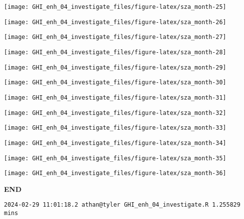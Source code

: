\documentclass[
  10pt,
  a4paper,oneside]{article}
\begin{document}
\begin{center}\texttt{[image: GHI\_enh\_04\_investigate\_files/figure-latex/sza\_month-25]} \end{center}

\begin{center}\texttt{[image: GHI\_enh\_04\_investigate\_files/figure-latex/sza\_month-26]} \end{center}

\begin{center}\texttt{[image: GHI\_enh\_04\_investigate\_files/figure-latex/sza\_month-27]} \end{center}

\begin{center}\texttt{[image: GHI\_enh\_04\_investigate\_files/figure-latex/sza\_month-28]} \end{center}

\begin{center}\texttt{[image: GHI\_enh\_04\_investigate\_files/figure-latex/sza\_month-29]} \end{center}

\begin{center}\texttt{[image: GHI\_enh\_04\_investigate\_files/figure-latex/sza\_month-30]} \end{center}

\begin{center}\texttt{[image: GHI\_enh\_04\_investigate\_files/figure-latex/sza\_month-31]} \end{center}

\begin{center}\texttt{[image: GHI\_enh\_04\_investigate\_files/figure-latex/sza\_month-32]} \end{center}

\begin{center}\texttt{[image: GHI\_enh\_04\_investigate\_files/figure-latex/sza\_month-33]} \end{center}

\begin{center}\texttt{[image: GHI\_enh\_04\_investigate\_files/figure-latex/sza\_month-34]} \end{center}

\begin{center}\texttt{[image: GHI\_enh\_04\_investigate\_files/figure-latex/sza\_month-35]} \end{center}

\begin{center}\texttt{[image: GHI\_enh\_04\_investigate\_files/figure-latex/sza\_month-36]} \end{center}

\textbf{END}

\begin{verbatim}
2024-02-29 11:01:18.2 athan@tyler GHI_enh_04_investigate.R 1.255829 mins
\end{verbatim}
\end{document}
